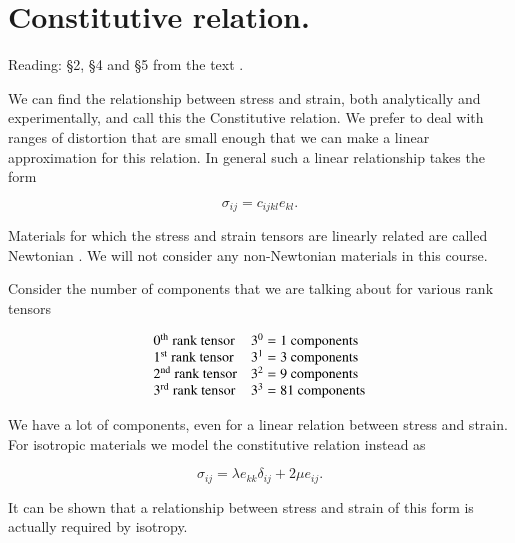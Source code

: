 \section{Constitutive relation.}

Reading: \S 2, \S 4 and \S 5 from the text \citep{landau1960theory}.

We can find the relationship between stress and strain, both analytically and experimentally, and call this the Constitutive relation.  We prefer to deal with ranges of distortion that are small enough that we can make a linear approximation for this relation.  In general such a linear relationship takes the form

\begin{equation}\label{eqn:continuumL5:70}
\sigma_{ij} = c_{ijkl} e_{kl}.
\end{equation}

Materials for which the stress and strain tensors are linearly related are called Newtonian .  We will not consider any non-Newtonian materials in this course.

Consider the number of components that we are talking about for various rank tensors

\begin{equation}\label{eqn:continuumL5:90}
\begin{array}{l l}
\mbox{$0^\text{th}$ rank tensor} & \mbox{$3^0 = 1$ components} \\
\mbox{$1^\text{st}$ rank tensor} & \mbox{$3^1 = 3$ components} \\
\mbox{$2^\text{nd}$ rank tensor} & \mbox{$3^2 = 9$ components} \\
\mbox{$3^\text{rd}$ rank tensor} & \mbox{$3^3 = 81$ components}
\end{array}
\end{equation}

We have a lot of components, even for a linear relation between stress and strain.  For isotropic materials we model the constitutive relation instead as

\begin{equation}\label{eqn:continuumL5:110}
\boxed{
\sigma_{ij} = \lambda e_{kk} \delta_{ij} + 2 \mu e_{ij}.
}
\end{equation}

It can be shown that a relationship between stress and strain of this form is actually required by isotropy.


